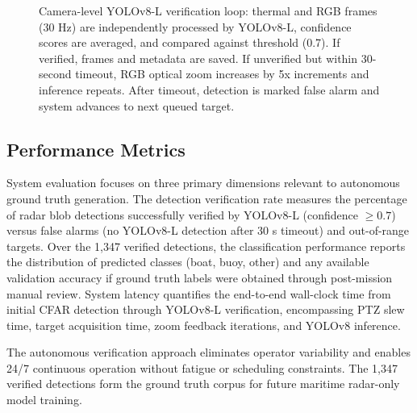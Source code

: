 \documentclass[twocolumn, 10pt]{article}
\begin{document}
\begin{figure}[t]
\caption{Camera-level YOLOv8-L verification loop: thermal and RGB frames (30 Hz) are independently processed by YOLOv8-L, confidence scores are averaged, and compared against threshold (0.7). If verified, frames and metadata are saved. If unverified but within 30-second timeout, RGB optical zoom increases by 5x increments and inference repeats. After timeout, detection is marked false alarm and system advances to next queued target.}
\label{fig:yolo_loop}
\end{figure}

\subsection{Performance Metrics}

System evaluation focuses on three primary dimensions relevant to autonomous ground truth generation. The detection verification rate measures the percentage of radar blob detections successfully verified by YOLOv8-L (confidence $\geq 0.7$) versus false alarms (no YOLOv8-L detection after 30 s timeout) and out-of-range targets. Over the 1,347 verified detections, the classification performance reports the distribution of predicted classes (boat, buoy, other) and any available validation accuracy if ground truth labels were obtained through post-mission manual review. System latency quantifies the end-to-end wall-clock time from initial CFAR detection through YOLOv8-L verification, encompassing PTZ slew time, target acquisition time, zoom feedback iterations, and YOLOv8 inference.

The autonomous verification approach eliminates operator variability and enables 24/7 continuous operation without fatigue or scheduling constraints. The 1,347 verified detections form the ground truth corpus for future maritime radar-only model training.
\end{document}

